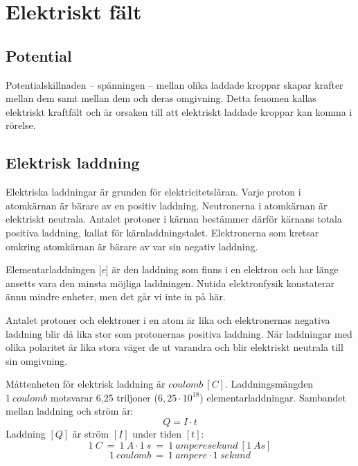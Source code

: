 \section{Elektriskt fält}
\label{elektriskafält}

\subsection{Potential}

Potentialskillnaden -- spänningen -- mellan olika laddade kroppar skapar
krafter mellan dem samt mellan dem och deras omgivning.
Detta fenomen kallas elektriskt kraftfält och är orsaken till att elektriskt
laddade kroppar kan komma i rörelse.

\subsection{Elektrisk laddning}

Elektriska laddningar är grunden för elektricitetsläran.
Varje proton i atomkärnan är bärare av en positiv laddning.
Neutronerna i atomkärnan är elektriskt neutrala.
Antalet protoner i kärnan bestämmer därför kärnans totala positiva
laddning, kallat för kärnladdningstalet.
Elektronerna som kretsar omkring atomkärnan är bärare av var sin negativ
laddning.

Elementarladdningen [\emph{e}] är den laddning som finns i en elektron och har
länge ansetts vara den minsta möjliga laddningen.
Nutida elektronfysik konstaterar ännu mindre enheter, men det går vi inte in på
här.

Antalet protoner och elektroner i en atom är lika och elektronernas
negativa laddning blir då lika stor som protonernas positiva laddning.
När laddningar med olika polaritet är lika stora väger de ut varandra och blir
elektriskt neutrala till sin omgivning.

Måttenheten för elektrisk laddning är \(coulomb\ [C]\).
Laddningsmängden \(1\ coulomb\) motsvarar 6,25 triljoner (\(6,25\cdot10^{18}\))
elementarladdningar. Sambandet mellan laddning och ström är:
\[Q = I \cdot t\]
Laddning $[Q]$ är ström $[I]$ under tiden $[t]$:
\[1\ C ~=~ 1\ A \cdot 1\ s ~=~ 1\ \textit{amperesekund}\ [1\ As]\]
\[1\ \textit{coulomb} ~=~ 1\ \textit{ampere} \cdot 1\ \textit{sekund}\]

